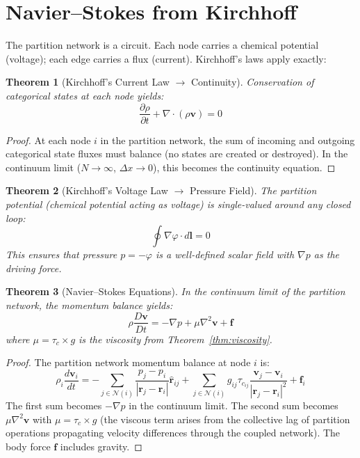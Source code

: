 \documentclass[twocolumn,10pt,a4paper]{article}
\theoremstyle{plain}
\newtheorem{theorem}{Theorem}[section]
\theoremstyle{definition}
\theoremstyle{remark}
\newcommand{\tauc}{\tau_c}
\begin{document}
\section{Navier--Stokes from Kirchhoff}
\label{sec:navier_stokes}

The partition network is a circuit. Each node carries a chemical potential (voltage); each edge carries a flux (current). Kirchhoff's laws apply exactly:

\begin{theorem}[Kirchhoff's Current Law $\to$ Continuity]
\label{thm:kcl}
Conservation of categorical states at each node yields:
\begin{equation}
    \frac{\partial \rho}{\partial t} + \nabla \cdot (\rho \mathbf{v}) = 0
\end{equation}
\end{theorem}

\begin{proof}
At each node $i$ in the partition network, the sum of incoming and outgoing categorical state fluxes must balance (no states are created or destroyed). In the continuum limit ($N \to \infty$, $\Delta x \to 0$), this becomes the continuity equation.
\end{proof}

\begin{theorem}[Kirchhoff's Voltage Law $\to$ Pressure Field]
\label{thm:kvl}
The partition potential (chemical potential acting as voltage) is single-valued around any closed loop:
\begin{equation}
    \oint \nabla \varphi \cdot d\mathbf{l} = 0
\end{equation}
This ensures that pressure $p = -\varphi$ is a well-defined scalar field with $\nabla p$ as the driving force.
\end{theorem}

\begin{theorem}[Navier--Stokes Equations]
\label{thm:ns}
In the continuum limit of the partition network, the momentum balance yields:
\begin{equation}
\boxed{\rho \frac{D\mathbf{v}}{Dt} = -\nabla p + \mu \nabla^2 \mathbf{v} + \mathbf{f}}
\end{equation}
where $\mu = \tauc \times g$ is the viscosity from Theorem~\ref{thm:viscosity}.
\end{theorem}

\begin{proof}
The partition network momentum balance at node $i$ is:
\begin{equation}
    \rho_i \frac{d\mathbf{v}_i}{dt} = -\sum_{j \in \mathcal{N}(i)} \frac{p_j - p_i}{|\mathbf{r}_j - \mathbf{r}_i|}\hat{\mathbf{r}}_{ij} + \sum_{j \in \mathcal{N}(i)} g_{ij} \tauc_{ij} \frac{\mathbf{v}_j - \mathbf{v}_i}{|\mathbf{r}_j - \mathbf{r}_i|^2} + \mathbf{f}_i
\end{equation}
The first sum becomes $-\nabla p$ in the continuum limit. The second sum becomes $\mu \nabla^2 \mathbf{v}$ with $\mu = \tauc \times g$ (the viscous term arises from the collective lag of partition operations propagating velocity differences through the coupled network). The body force $\mathbf{f}$ includes gravity.
\end{proof}
\end{document}
